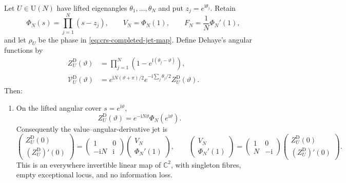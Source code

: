 \begin{theorem}
\label{thm:dehaye-angular-jet-crosswalk}
Let $U\in\mathrm U(N)$ have lifted eigenangles $\theta_1,\ldots,\theta_N$ and
put $z_j=e^{\mathrm i\theta_j}$.  Retain
\[
 \Phi_N(s)=\prod_{j=1}^{N}(s-z_j),\qquad
 V_N=\Phi_N(1),\qquad F_N=\frac1N\Phi_N'(1),
\]
and let $\rho_U$ be the phase in \eqref{eq:crs-completed-jet-map}.  Define
Dehaye's angular functions by
\begin{align}
 Z_U^{\mathrm D}(\vartheta)
 &=\prod_{j=1}^{N}\left(1-e^{\mathrm i(\theta_j-\vartheta)}\right),
 \label{eq:dehaye-angular-polynomial}\\
 \mathcal V_U^{\mathrm D}(\vartheta)
 &=e^{\mathrm iN(\vartheta+\pi)/2}
   e^{-\mathrm i\sum_j\theta_j/2}Z_U^{\mathrm D}(\vartheta).
 \label{eq:dehaye-completed-angular-polynomial}
\end{align}
Then:

\begin{enumerate}
 \item On the lifted angular cover $s=e^{\mathrm i\vartheta}$,
 \begin{equation}
  Z_U^{\mathrm D}(\vartheta)
  =e^{-\mathrm iN\vartheta}\Phi_N(e^{\mathrm i\vartheta}).
  \label{eq:dehaye-angular-radial-map}
 \end{equation}
 Consequently the value--angular-derivative jet is
 \begin{equation}
  \begin{pmatrix}Z_U^{\mathrm D}(0)\\(Z_U^{\mathrm D})'(0)\end{pmatrix}
  =
  \begin{pmatrix}1&0\\-\mathrm iN&\mathrm i\end{pmatrix}
  \begin{pmatrix}V_N\\\Phi_N'(1)\end{pmatrix},
  \qquad
  \begin{pmatrix}V_N\\\Phi_N'(1)\end{pmatrix}
  =
  \begin{pmatrix}1&0\\N&-\mathrm i\end{pmatrix}
  \begin{pmatrix}Z_U^{\mathrm D}(0)\\(Z_U^{\mathrm D})'(0)\end{pmatrix}.
  \label{eq:dehaye-angular-jet-bijection}
 \end{equation}
 This is an everywhere invertible linear map of $\mathbb C^2$, with singleton
 fibres, empty exceptional locus, and no information loss.


\end{enumerate}
\end{theorem}
